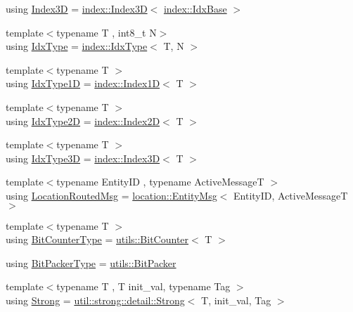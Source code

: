 \begin{DoxyCompactItemize}
\item 
using \hyperlink{namespacevt_a2c8053bc5f2df4934272542fb3e5a0bc}{Index3D} = \hyperlink{namespacevt_1_1index_a2c09a09f7346d370a0bcbbfb0d4459cd}{index\+::\+Index3D}$<$ \hyperlink{namespacevt_1_1index_a0dbb8d47463da27c1436e8e4ddb02743}{index\+::\+Idx\+Base} $>$
\item 
{\footnotesize template$<$typename T , int8\+\_\+t N$>$ }\\using \hyperlink{namespacevt_a906c25b521ff516f5e8ba6d96fe2d424}{Idx\+Type} = \hyperlink{namespacevt_1_1index_a939bace7aba6cd4a76b2c12a138c5991}{index\+::\+Idx\+Type}$<$ T, N $>$
\item 
{\footnotesize template$<$typename T $>$ }\\using \hyperlink{namespacevt_a36127c6500f2311908c959be653da40e}{Idx\+Type1D} = \hyperlink{namespacevt_1_1index_a091a4f5a7a2c993d9727eaa60cf67d81}{index\+::\+Index1D}$<$ T $>$
\item 
{\footnotesize template$<$typename T $>$ }\\using \hyperlink{namespacevt_ab0fbc5ddf69b5aa0ed6a8d1658b504eb}{Idx\+Type2D} = \hyperlink{namespacevt_1_1index_a8373801efc8343f24d6e8ba57df40a69}{index\+::\+Index2D}$<$ T $>$
\item 
{\footnotesize template$<$typename T $>$ }\\using \hyperlink{namespacevt_a65e4a83c0567ecb7a54b78e9b8e7d7ab}{Idx\+Type3D} = \hyperlink{namespacevt_1_1index_a2c09a09f7346d370a0bcbbfb0d4459cd}{index\+::\+Index3D}$<$ T $>$
\item 
{\footnotesize template$<$typename Entity\+ID , typename Active\+MessageT $>$ }\\using \hyperlink{namespacevt_a0cb65f2151629893480ef391def4e733}{Location\+Routed\+Msg} = \hyperlink{structvt_1_1location_1_1_entity_msg}{location\+::\+Entity\+Msg}$<$ Entity\+ID, Active\+MessageT $>$
\item 
{\footnotesize template$<$typename T $>$ }\\using \hyperlink{namespacevt_a34b3eb2eea8db3cf4ae27ced35b19b46}{Bit\+Counter\+Type} = \hyperlink{structvt_1_1utils_1_1_bit_counter}{utils\+::\+Bit\+Counter}$<$ T $>$
\item 
using \hyperlink{namespacevt_a80d5091925c65efd88ca7f49fe1d633b}{Bit\+Packer\+Type} = \hyperlink{structvt_1_1utils_1_1_bit_packer}{utils\+::\+Bit\+Packer}
\item 
{\footnotesize template$<$typename T , T init\+\_\+val, typename Tag $>$ }\\using \hyperlink{namespacevt_adbd3338278905742eb2de6db590fd2f1}{Strong} = \hyperlink{structvt_1_1util_1_1strong_1_1detail_1_1_strong}{util\+::strong\+::detail\+::\+Strong}$<$ T, init\+\_\+val, Tag $>$

\end{DoxyCompactItemize}
